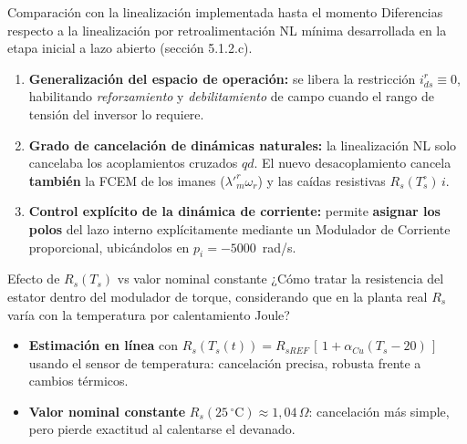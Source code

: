\documentclass[aspectratio=169,t]{beamer}
\begin{document}
\begin{frame}{Comparación con la linealización implementada hasta el momento}
{\small\color{uncGray}Diferencias respecto a la linealización por retroalimentación NL mínima desarrollada en la etapa inicial a lazo abierto (sección 5.1.2.c).}\par
\vspace{4mm}

\begin{enumerate}
\item \textbf{Generalización del espacio de operación:} se libera la restricción $i_{ds}^{r}\equiv 0$, habilitando \emph{reforzamiento} y \emph{debilitamiento} de campo cuando el rango de tensión del inversor lo requiere.

\item \textbf{Grado de cancelación de dinámicas naturales:} la linealización NL solo cancelaba los acoplamientos cruzados $qd$. El nuevo desacoplamiento cancela \textbf{también} la FCEM de los imanes ($\lambda'^r_m\omega_r$) y las caídas resistivas $R_s(T_s^\circ)\,i$.

\item \textbf{Control explícito de la dinámica de corriente:} permite \textbf{asignar los polos} del lazo interno explícitamente mediante un Modulador de Corriente proporcional, ubicándolos en $p_i = -5000$~rad/s.
\end{enumerate}
\end{frame}

\begin{frame}{Efecto de $R_s(T_s)$ vs valor nominal constante}
{\small\color{uncGray}¿Cómo tratar la resistencia del estator dentro del modulador de torque, considerando que en la planta real $R_s$ varía con la temperatura por calentamiento Joule?}\par
\vspace{4mm}

\begin{itemize}
\item \textbf{Estimación en línea} con $R_s(T_s(t)) = R_{sREF}\,[\,1 + \alpha_{Cu}(T_s - 20)\,]$ usando el sensor de temperatura: cancelación precisa, robusta frente a cambios térmicos.

\item \textbf{Valor nominal constante} $R_s(25\,^\circ\text{C}) \approx 1{,}04\,\Omega$: cancelación más simple, pero pierde exactitud al calentarse el devanado.
\end{itemize}

\end{frame}
\end{document}
